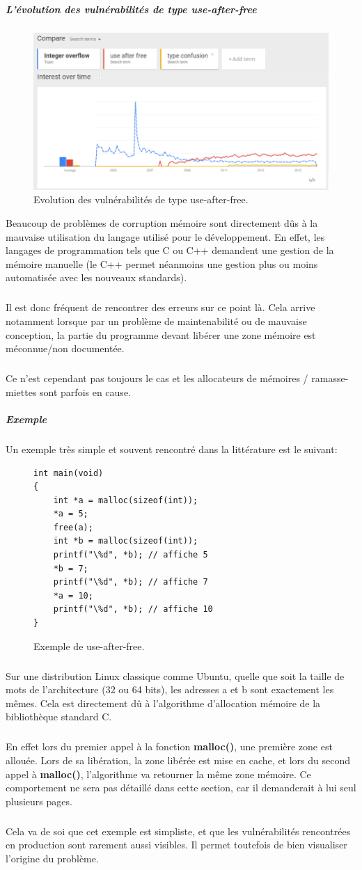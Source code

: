 \subparagraph{L'évolution des vulnérabilités de type use-after-free}
\begin{figure}[h]
    \centering
    \includegraphics[scale=0.5]{images/histogramme-uaf.png}
    \caption{Evolution des vulnérabilités de type use-after-free.}
\end{figure}
Beaucoup de problèmes de corruption mémoire sont directement dûs à la mauvaise utilisation
du langage utilisé pour le développement. En effet, les langages de programmation tels que C
ou C++ demandent une gestion de la mémoire manuelle (le C++ permet néanmoins une gestion plus ou moins automatisée
avec les nouveaux standards).
\subparagraph{}
Il est donc fréquent de rencontrer des erreurs sur ce point là. Cela arrive
notamment lorsque par un problème de maintenabilité ou de mauvaise conception, la partie du programme devant
libérer une zone mémoire est méconnue/non documentée.\subparagraph{}
Ce n'est cependant pas toujours le cas et les allocateurs de mémoires / ramasse-miettes sont parfois en cause.

\subparagraph{Exemple}
Un exemple très simple et souvent rencontré dans la littérature est le suivant:
\begin{figure}[h]
    \centering
    \begin {lstlisting}[frame=single]
int main(void)
{
    int *a = malloc(sizeof(int));
    *a = 5;
    free(a);
    int *b = malloc(sizeof(int));
    printf("\%d", *b); // affiche 5
    *b = 7;
    printf("\%d", *b); // affiche 7
    *a = 10;
    printf("\%d", *b); // affiche 10
}
    \end{lstlisting}
    \caption{Exemple de use-after-free.}
\end{figure}
\subparagraph{}
Sur une distribution Linux classique comme Ubuntu, quelle que soit la taille de mots
de l'architecture (32 ou 64 bits), les adresses a et b sont exactement les mêmes.
Cela est directement dû à l'algorithme d'allocation mémoire de la bibliothèque standard
C.\subparagraph{}
En effet lors du premier appel à la fonction \textbf{malloc()}, une première zone est allouée.
Lors de sa libération, la zone libérée est mise en cache, et lors du second appel à \textbf{malloc()},
l'algorithme va retourner la même zone mémoire. Ce comportement ne sera pas détaillé dans cette section, car
il demanderait à lui seul plusieurs pages.\subparagraph{}
Cela va de soi que cet exemple est simpliste, et que les vulnérabilités rencontrées en production sont
rarement aussi visibles. Il permet toutefois de bien visualiser l'origine du problème.


